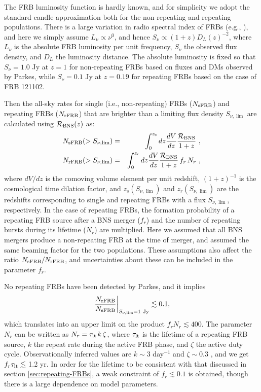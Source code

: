 \documentclass[]{pasj01}
\begin{document}
The FRB luminosity function is hardly known, and for simplicity we
adopt the standard candle approximation both for the non-repeating and
repeating populations. There is a large variation in radio spectral
index of FRBs (e.g., \cite{Spitler2014}), and here we simply assume
$L_\nu \propto \nu^0$, and hence $S_\nu \propto (1+z) D_L(z)^{-2}$,
where $L_\nu$ is the absolute FRB luminosity per unit frequency,
$S_\nu$ the observed flux density, and $D_L$ the luminosity
distance. The absolute luminosity is fixed so that $S_\nu = 1.0$ Jy at
$z = 1$ for non-repeating FRBs based on fluxes and DMs observed by
Parkes, while $S_\nu = 0.1$ Jy at $z = 0.19$ for repeating FRBs based
on the case of FRB 121102.

Then the all-sky rates for single (i.e., non-repeating) FRBs ($N_{\rm
  sFRB}$) and repeating FRBs ($N_{\rm rFRB}$) that are brighter than a
limiting flux density $S_{\nu, \lim}$ are calculated using ${\cal
  R}_{\rm BNS}(z)$ as:
\begin{eqnarray}
\label{eq: sFRB rate}
N_{\rm sFRB}(> S_{\nu, \lim}) &=& 
\int_0^{z_{\rm s}} dz \frac{dV}{dz}\frac{{\cal R}_{\rm BNS}}{1+z} \ , \\
\label{eq: rFRB rate}
N_{\rm rFRB}(> S_{\nu, \lim}) &=& 
\int_0^{z_{\rm r}} dz \frac{dV}{dz}\frac{{\cal R}_{\rm BNS}}{1+z}
\, f_r \, N_r \ ,
\end{eqnarray}
where $dV/dz$ is the comoving volume element per unit redshift,
$(1+z)^{-1}$ is the cosmological time dilation factor, and
$z_s(S_{\nu, \lim})$ and $z_r(S_{\nu, \lim})$ are the redshifts
corresponding to single and repeating FRBs with a flux $S_{\nu, \lim}$,
respectively.  In the case of repeating FRBs, the formation
probability of a repeating FRB source after a BNS merger ($f_r$) and
the number of repeating bursts during its lifetime ($N_r$) are
multiplied.  Here we assumed that all BNS mergers produce a
non-repeating FRB at the time of merger, and assumed the same beaming
factor for the two populations. These assumptions also affect the
ratio $N_{\rm sFRB}/N_{\rm rFRB}$, and uncertainties about these can
be included in the parameter $f_r$.

No repeating FRBs have been detected by Parkes,
and it implies 
\begin{eqnarray}
  \left.\frac{N_{\rm rFRB}}{N_{\rm sFRB}}\right|_{S_{\nu, \rm lim} = 1 \ {\rm Jy}}
\lesssim 0.1,
\end{eqnarray}
which translates into an upper limit on the product $f_r N_r \lesssim
400$. The parameter $N_r$ can be written as $N_r = \tau_{\rm lt} \, k
\, \zeta$, where $\tau_{\rm lt}$ is the lifetime of a repeating FRB
source, $k$ the repeat rate during the active FRB phase, and $\zeta$
the active duty cycle.  Observationally inferred values are $k\sim 3$
day$^{-1}$ and $\zeta\sim0.3$ \citep{Nicholl2017}, and we get $f_r
\tau_{\rm lt} \lesssim$ 1.2 yr. In order for the lifetime to be
consistent with that discussed in section \ref{sec:repeating-FRBs}, a
weak constraint of $f_r \lesssim 0.1$ is obtained, though there is a
large dependence on model parameters.
\end{document}
